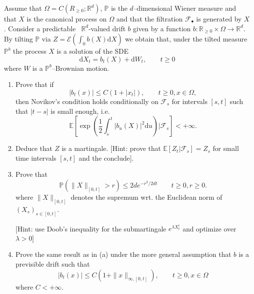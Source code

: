 \documentclass{article}
\newcommand{\mathd}{\mathrm{d}}
\newenvironment{enumeratealpha}{\begin{enumerate}[a{\textup{)}}] }{\end{enumerate}}
{\theorembodyfont{\rmfamily\small}\newtheorem{exercise}{Exercise}}
\begin{document}
\begin{exercise}
  [Pts 2+2+2+2] Assume that $\Omega = C (R_{\geqslant 0} ; \mathbb{R}^d)$,
  $\mathbb{P}$ is the $d$--dimensional Wiener measure and that $X$ is the
  canonical process on $\Omega$ and that the filtration
  $\mathcal{F}_{\bullet}$ is generated by $X$. Consider a predictable \
  $\mathbb{R}^d$-valued drift $b$ given by a function $b :
  \mathbb{R}_{\geqslant 0} \times \Omega \rightarrow \mathbb{R}^d$. By tilting
  $\mathbb{P}$ via $Z =\mathcal{E} \left( \int_0^{\cdot} b (X) \mathd X
  \right)$ we obtain that, under the tilted measure $\mathbb{P}^b$ the process
  $X$ is a solution of the SDE
  \[ \mathd X_t = b_t (X) + \mathd W_t, \qquad t \geqslant 0 \]
  where $W$ is a $\mathbb{P}^b$--Brownian motion.
  \begin{enumeratealpha}
    \item Prove that if
    \[ | b_t (x) | \leqslant C (1 + | x_t |), \qquad t \geqslant 0, x \in
       \Omega, \]
    then Novikov's condition holds conditionally on $\mathcal{F}_s$ for
    intervals $[s, t]$ such that $| t - s |$ is small enough, i.e.
    \[ \mathbb{E} \left[ \exp \left( \frac{1}{2} \int_s^t | b_u (X) |^2 \mathd
       u \right) |\mathcal{F}_s \right] < + \infty . \]
    \item Deduce that $Z$ is a martingale. [Hint: prove that $\mathbb{E} [Z_t
    |\mathcal{F}_s] = Z_s$ for small time intervals $[s, t]$ and the
    conclude].
    
    \item Prove that
    \[ \mathbb{P} (\| X \|_{[0, t]} > r) \leqslant 2 d e^{- r^2 / 2 d t}
       \qquad t \geqslant 0, r \geqslant 0. \]
    where $\| X \|_{[0, t]}$ denotes the supremum wrt. the Euclidean norm of
    $(X_s)_{s \in [0, t]}$.
    
    [Hint: use Doob's inequality for the submartingale $e^{\lambda X^i_t}$ and
    optimize over $\lambda > 0$]
    
    \item Prove the same result as in (a) under the more general assumption
    that $b$ is a previsible drift such that
    \[ | b_t (x) | \leqslant C (1 + \| x \|_{\infty, [0, t]}), \qquad t
       \geqslant 0, x \in \Omega \]
    where $C < + \infty$.
  \end{enumeratealpha}
\end{exercise}

\hrulefill
\end{document}
